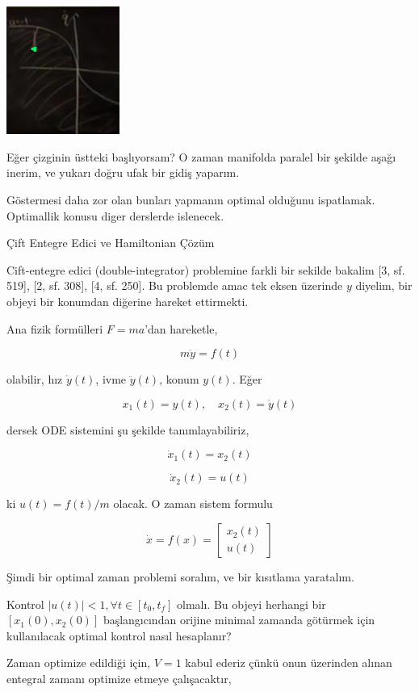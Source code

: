 \documentclass[12pt,fleqn]{article}\usepackage{../../common}
\begin{document}
\includegraphics[width=10em]{phy_control_05.png}

Eğer çizginin üstteki başlıyorsam? O zaman manifolda paralel bir şekilde
aşağı inerim, ve yukarı doğru ufak bir gidiş yaparım. 

Göstermesi daha zor olan bunları yapmanın optimal olduğunu
ispatlamak. Optimallik konusu diger derslerde islenecek.

Çift Entegre Edici ve Hamiltonian Çözüm

Cift-entegre edici (double-integrator) problemine farkli bir sekilde
bakalim [3, sf. 519], [2, sf. 308], [4, sf. 250]. Bu problemde amac
tek eksen üzerinde $y$ diyelim, bir objeyi bir konumdan diğerine
hareket ettirmekti.

Ana fizik formülleri $F = ma$'dan hareketle,

$$
m \ddot{y} = f(t)
$$

olabilir, hız $\dot{y}(t)$, ivme $\ddot{y}(t)$, konum $y(t)$. Eğer

$$
x_1(t) = y(t), \quad x_2(t) = \dot{y}(t)
$$

dersek ODE sistemini şu şekilde tanımlayabiliriz,

$$
\dot{x}_1(t) = x_2(t)
$$

$$
\dot{x}_2(t) = u(t)
$$

ki $u(t) = f(t)/m$ olacak. O zaman sistem formulu

$$
\dot{x} = f(x) = \left[\begin{array}{r}
x_2(t) \\ u(t)
\end{array}\right]
$$

Şimdi bir optimal zaman problemi soralım, ve bir kısıtlama
yaratalım.

Kontrol $|u(t)| < 1, \forall t \in [t_0,t_f]$ olmalı. Bu objeyi
herhangi bir $[x_1(0),x_2(0)]$ başlangıcından orijine minimal zamanda
götürmek için kullanılacak optimal kontrol nasıl hesaplanır?

Zaman optimize edildiği için, $V = 1$ kabul ederiz çünkü onun
üzerinden alınan entegral zamanı optimize etmeye çalışacaktır,
\end{document}
